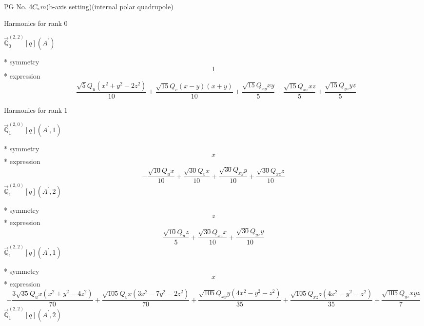 \documentclass[fleqn,8pt]{jsarticle}
\begin{document}
\setcounter{MaxMatrixCols}{32}

\renewcommand{\tablename}{Table~}
\renewcommand{\figurename}{Figure~}
\begin{center}
\LARGE
PG No. 4\quad$C_{\rm s}$\quad$m$\quad(b-axis setting)\quad[ monoclinic ] (internal polar quadrupole)
\end{center}

\noindent * Harmonics for rank 0

\noindent\quad $\vec{\mathbb{Q}}_{0}^{(2,2)}[q](A^{\prime})$

\noindent\quad ** symmetry
\begin{dmath*}
1
\end{dmath*}
\noindent\quad ** expression
\begin{dmath*}
- \frac{\sqrt{5} Q_{u} \left(x^{2} + y^{2} - 2 z^{2}\right)}{10} + \frac{\sqrt{15} Q_{v} \left(x - y\right) \left(x + y\right)}{10} + \frac{\sqrt{15} Q_{xy} x y}{5} + \frac{\sqrt{15} Q_{xz} x z}{5} + \frac{\sqrt{15} Q_{yz} y z}{5}
\end{dmath*}

\noindent * Harmonics for rank 1

\noindent\quad $\vec{\mathbb{Q}}_{1}^{(2,0)}[q](A^{\prime},1)$

\noindent\quad ** symmetry
\begin{dmath*}
x
\end{dmath*}
\noindent\quad ** expression
\begin{dmath*}
- \frac{\sqrt{10} Q_{u} x}{10} + \frac{\sqrt{30} Q_{v} x}{10} + \frac{\sqrt{30} Q_{xy} y}{10} + \frac{\sqrt{30} Q_{xz} z}{10}
\end{dmath*}
\noindent\quad $\vec{\mathbb{Q}}_{1}^{(2,0)}[q](A^{\prime},2)$

\noindent\quad ** symmetry
\begin{dmath*}
z
\end{dmath*}
\noindent\quad ** expression
\begin{dmath*}
\frac{\sqrt{10} Q_{u} z}{5} + \frac{\sqrt{30} Q_{xz} x}{10} + \frac{\sqrt{30} Q_{yz} y}{10}
\end{dmath*}
\noindent\quad $\vec{\mathbb{Q}}_{1}^{(2,2)}[q](A^{\prime},1)$

\noindent\quad ** symmetry
\begin{dmath*}
x
\end{dmath*}
\noindent\quad ** expression
\begin{dmath*}
- \frac{3 \sqrt{35} Q_{u} x \left(x^{2} + y^{2} - 4 z^{2}\right)}{70} + \frac{\sqrt{105} Q_{v} x \left(3 x^{2} - 7 y^{2} - 2 z^{2}\right)}{70} + \frac{\sqrt{105} Q_{xy} y \left(4 x^{2} - y^{2} - z^{2}\right)}{35} + \frac{\sqrt{105} Q_{xz} z \left(4 x^{2} - y^{2} - z^{2}\right)}{35} + \frac{\sqrt{105} Q_{yz} x y z}{7}
\end{dmath*}
\noindent\quad $\vec{\mathbb{Q}}_{1}^{(2,2)}[q](A^{\prime},2)$
\end{document}
